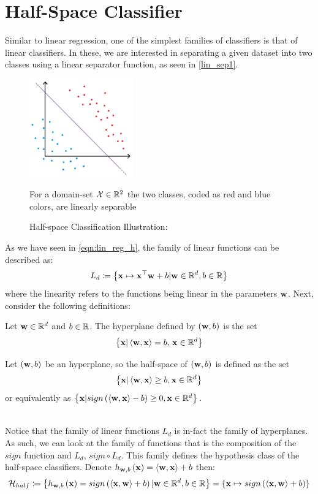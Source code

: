 \section{Half-Space Classifier}
Similar to linear regression, one of the simplest families of classifiers is that of linear classifiers. In these, we are interested in separating a given dataset into two classes using a linear separator function, as seen in \autoref{lin_sep1}.

\begin{figure}[h!] %
	\centering
	\includegraphics[width=0.4\textwidth]{chapters/classification/figures/3_1.png}
	\caption{Half-space Classification Illustration:} For a domain-set $\mathcal{X}\in\mathbb{R}^2$ the two classes, coded as red and blue colors, are linearly separable \label{lin_sep1}
\end{figure}

As we have seen in \autoref{eqn:lin_reg_h}, the family of linear functions can be described as: $$ L_d \coloneqq \left\{\mathbf{x}\mapsto \mathbf{x}^\top \mathbf{w} + b | \mathbf{w}\in\mathbb{R}^d,b\in\mathbb{R}\right\} $$
where the linearity refers to the functions being linear in the parameters $\mathbf{w}$. Next, consider the following definitions:

\begin{definition}\label{def:hyperplane}
Let $\mathbf{w}\in\mathbb{R}^d$ and $b\in\mathbb{R}$. The hyperplane defined by $\left(\mathbf{w},b\right)$ is the set $$\left\{\mathbf{x}|\left\langle \mathbf{w},\mathbf{x}\right\rangle=b,\,\mathbf{x}\in\mathbb{R}^d\right\}$$
\end{definition}
\begin{definition}\label{def:halfspace}
Let $\left(\mathbf{w},b\right)$ be an hyperplane, so the half-space of $\left(\mathbf{w},b\right)$ is defined as the set $$\left\{\mathbf{x}|\left\langle \mathbf{w},\mathbf{x}\right\rangle\geq b, \mathbf{x}\in\mathbb{R}^d\right\}$$or equivalently as $\left\{\mathbf{x}|sign\left(\left\langle \mathbf{w},\mathbf{x}\right\rangle - b\right)\geq 0,\mathbf{x}\in\mathbb{R}^d\right\}$.
\end{definition}

~\\Notice that the family of linear functions $L_d$ is in-fact the family of hyperplanes. As such, we can look at the family of functions that is the composition of the $sign$ function and $L_d$, $sign\circ L_{d}$. This family defines the hypothesis class of the half-space classifiers. Denote $h_{\mathbf{w},b}\left(\mathbf{x}\right) = \left\langle \mathbf{w},\mathbf{x}\right\rangle + b$ then:
\begin{equation}
\mathcal{H}_{half} \coloneqq \left\{h_{\mathbf{w},b}\left(\mathbf{x}\right)=sign\left(\left\langle \mathbf{x},\mathbf{w}\right\rangle + b\right)|\mathbf{w}\in\mathbb{R}^d,b\in\mathbb{R}\right\} = \left\{\mathbf{x}\mapsto sign\left(\left\langle \mathbf{x},\mathbf{w}\right\rangle+b\right)\right\}
\label{eqn:h_half}
\end{equation}

